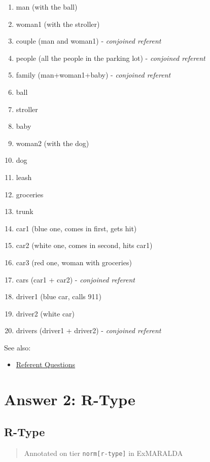\documentclass[
]{book}
\providecommand{\tightlist}{%
  \setlength{\itemsep}{0pt}\setlength{\parskip}{0pt}}
\begin{document}
\begin{enumerate}
\def\labelenumi{\arabic{enumi}.}
\tightlist
\item
  man (with the ball)
\item
  woman1 (with the stroller)
\item
  couple (man and woman1) - \emph{conjoined referent}
\item
  people (all the people in the parking lot) - \emph{conjoined referent}
\item
  family (man+woman1+baby) - \emph{conjoined referent}
\item
  ball
\item
  stroller
\item
  baby
\item
  woman2 (with the dog)
\item
  dog
\item
  leash
\item
  groceries
\item
  trunk
\item
  car1 (blue one, comes in first, gets hit)
\item
  car2 (white one, comes in second, hits car1)
\item
  car3 (red one, woman with groceries)
\item
  cars (car1 + car2) - \emph{conjoined referent}
\item
  driver1 (blue car, calls 911)
\item
  driver2 (white car)
\item
  drivers (driver1 + driver2) - \emph{conjoined referent}
\end{enumerate}

See also:

\begin{itemize}
\tightlist
\item
  \protect\hyperlink{referents-1}{Referent Questions}
\end{itemize}

\hypertarget{answer-2-r-type}{%
\chapter{Answer 2: R-Type}\label{answer-2-r-type}}

\hypertarget{r-type}{%
\section{R-Type}\label{r-type}}

\begin{quote}
Annotated on tier \texttt{norm{[}r-type{]}} in ExMARALDA
\end{quote}
\end{document}
